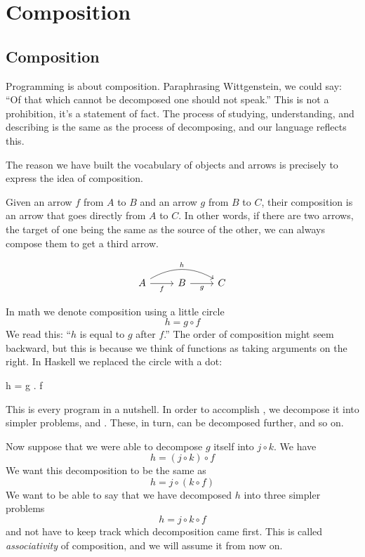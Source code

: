 \documentclass[DaoFP]{subfiles}
\begin{document}
\setcounter{chapter}{1}
\chapter{Composition}

\section{Composition}

Programming is about composition. Paraphrasing Wittgenstein, we could say: ``Of that which cannot be decomposed one should not speak.'' This is not a prohibition, it's a statement of fact. The process of studying, understanding, and describing is the same as the process of decomposing, and our language reflects this. 

The reason we have built the vocabulary of objects and arrows is precisely to express the idea of composition.  

Given an arrow $f$ from $A$ to $B$ and an arrow $g$ from $B$ to $C$, their composition is an arrow that goes directly from $A$ to $C$. In other words, if there are two arrows, the target of one being the same as the source of the other, we can always compose them to get a third arrow.

\[
 \begin{tikzcd}
 A
 \arrow[rr, bend left, "h"]
 \arrow[r, "f"']
 & B
 \arrow[r, "g"']
& C
 \end{tikzcd}
\]

In math we denote composition using a little circle
\[h = g \circ f\]
We read this: ``$h$ is equal to $g$ after $f$.'' The order of composition might seem backward, but this is because we think of functions as taking arguments on the right.
In Haskell we replaced the circle with a dot:
\begin{haskell}
h = g . f
\end{haskell}
This is every program in a nutshell. In order to accomplish , we decompose it into simpler problems,  and . These, in turn, can be decomposed further, and so on.

Now suppose that we were able to decompose $g$ itself into $j \circ k$. We have
\[h = (j \circ k) \circ f\]
We want this decomposition to be the same as
\[h = j \circ (k \circ f)\]
We want to be able to say that we have decomposed $h$ into three simpler problems
\[h =  j \circ k \circ f\]
and not have to keep track which decomposition came first. This is called \emph{associativity} of composition, and we will assume it from now on.
\end{document}

